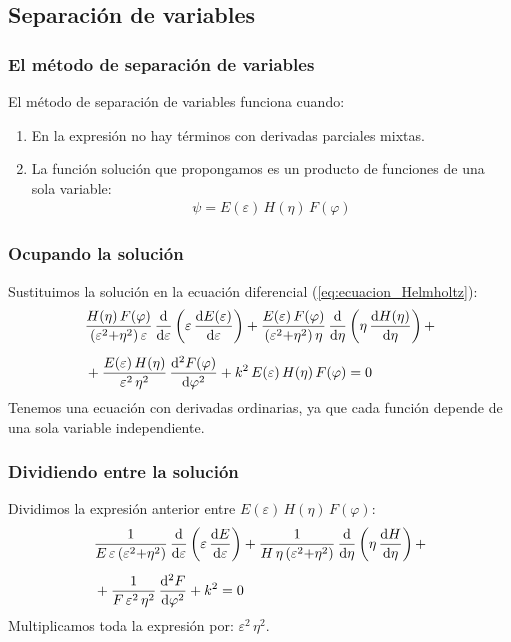 \documentclass[12pt]{beamer}
\begin{document}
\subsection{Separación de variables}

\begin{frame}
\frametitle{El método de separación de variables}
El método de separación de variables funciona cuando:
\pause
{}
\begin{enumerate}[<+->]
\item En la expresión no hay términos con derivadas parciales mixtas.
\item La función solución que propongamos es un producto de funciones de una sola variable:
\pause
\begin{align*}
\psi = E(\varepsilon) \, H(\eta) \, F(\varphi)
\end{align*}
\end{enumerate}
\end{frame}
\begin{frame}
\frametitle{Ocupando la solución}
Sustituimos la solución en la ecuación diferencial (\ref{eq:ecuacion_Helmholtz}):
\pause
\begin{align*}
&\dfrac{H(\eta) \, F(\varphi)}{(\varepsilon^{2} {+} \eta^{2}) \, \varepsilon} \, \dv{\varepsilon} \left( \varepsilon \, \dv{E(\varepsilon)}{\varepsilon} \right) + 
\dfrac{E(\varepsilon) \, F(\varphi)}{(\varepsilon^{2} {+} \eta^{2}) \, \eta} \, \dv{\eta} \left( \eta \, \dv{H(\eta)}{\eta} \right) + \\[0.5em]
&+ \dfrac{E(\varepsilon) \, H(\eta)}{\varepsilon^{2} \, \eta^{2}} \, \dv[2]{F(\varphi)}{\varphi} + k^{2} \, E(\varepsilon) \, H(\eta) \, F(\varphi) = 0
\end{align*}
\pause
Tenemos una ecuación con derivadas ordinarias, ya que cada función depende de una sola variable independiente.
\end{frame}
\begin{frame}
\frametitle{Dividiendo entre la solución}
Dividimos la expresión anterior entre $E(\varepsilon) \, H(\eta) \, F(\varphi)$:
\pause
\begin{align*}
&\dfrac{1}{E \, \varepsilon \, (\varepsilon^{2} {+} \eta^{2})} \, \dv{\varepsilon} \left( \varepsilon \, \dv{E}{\varepsilon} \right) + 
\dfrac{1}{H \, \eta \, (\varepsilon^{2} {+} \eta^{2})} \, \dv{\eta} \left( \eta \, \dv{H}{\eta} \right) + \\[0.5em]
&+ \dfrac{1}{ F \,  \varepsilon^{2} \, \eta^{2}} \, \dv[2]{F}{\varphi} + k^{2} = 0    
\end{align*}
\pause
Multiplicamos toda la expresión por: $\varepsilon^{2} \, \eta^{2}$.
\end{frame}
\end{document}
